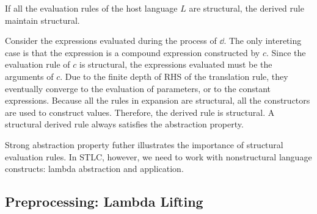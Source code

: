 
\begin{theorem}
  If all the evaluation rules of the host language $L$ are structural,
  the derived rule maintain structural.
\end{theorem}


Consider the expressions evaluated during the process of $\dd$.
The only intereting case is that the expression is a compound expression constructed by $c$.
Since the evaluation rule of $c$ is structural, the expressions evaluated must be the arguments of $c$.
Due to the finite depth of RHS of the translation rule,
  they eventually converge to the evaluation of parameters,
  or to the constant expressions.
Because all the rules in expansion are structural, all the constructors are used to construct values.
Therefore, the derived rule is structural.
A structural derived rule always satisfies the abstraction property.

Strong abstraction property futher illustrates the importance of structural evaluation rules.
In STLC, however, we need to work with nonstructural language constructs: lambda abstraction and application.

\subsection{Preprocessing: Lambda Lifting}

